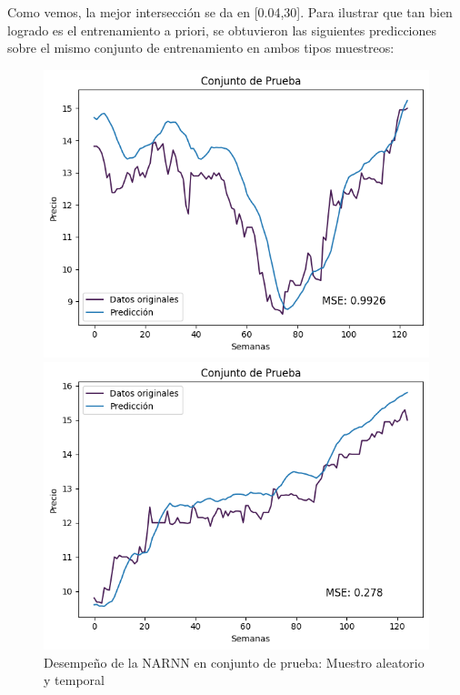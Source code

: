 Como vemos, la mejor intersección se da en [0.04,30]. Para ilustrar que tan bien logrado es el entrenamiento a priori, se obtuvieron las siguientes predicciones sobre el mismo conjunto de entrenamiento en ambos tipos muestreos:

\begin{figure}[H]
    \begin{minipage}{0.5\textwidth}
        \centering
        \includegraphics[width=\linewidth]{Figuras/proceso_de_entrenamiento/grafs_c_prueba/muestreo_aleatorio/NARNN/estandar/NARNN.png}
    \end{minipage}
    \begin{minipage}{0.5\textwidth}
        \centering
        \includegraphics[width=\linewidth]{Figuras/proceso_de_entrenamiento/grafs_c_prueba/NARNN/estandar/NARNN.png}
        
    \end{minipage}
    \caption{Desempeño de la NARNN en conjunto de prueba: Muestro aleatorio y temporal} 
    \label{fig:c_prueba_NARNN}
\end{figure}

